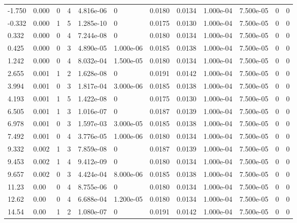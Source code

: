 \documentclass[preview]{standalone}
\begin{document}
{{\begin{tabular}{L{1.2cm}C{1.2cm} C{0.3cm}C{0.5cm} C{1.4cm}C{1.4cm} C{1.4cm}C{1.4cm} C{1.6cm}C{1.6cm} C{1.6cm}C{1.6cm}}
  -1.750  &  0.000  & 0     &  4 &  4.816e-06  & 0  &  0.0180&   0.0134& 1.000e-04 & 7.500e-05   &  0 & 0  \\ 
  -0.332  &  0.000  & 1     &  5 &  1.285e-10  & 0  &  0.0175&   0.0130& 1.000e-04 & 7.500e-05   &  0 & 0  \\ 
  0.332  &  0.000  & 0     &  4 &  7.244e-08  & 0  &  0.0180&   0.0134& 1.000e-04 & 7.500e-05   &  0 & 0  \\ 
  0.425  &  0.000  & 0     &  3 &  4.890e-05  & 1.000e-06  &  0.0185&   0.0138& 1.000e-04 & 7.500e-05   &  0 & 0  \\ 
  1.242  &  0.000  & 0     &  4 &  8.032e-04  & 1.500e-05  &  0.0180&   0.0134& 1.000e-04 & 7.500e-05   &  0 & 0  \\ 
  2.655  &  0.001  & 1     &  2 &  1.628e-08  & 0  &  0.0191&   0.0142& 1.000e-04 & 7.500e-05   &  0 & 0  \\ 
  3.994  &  0.001  & 0     &  3 &  1.817e-04  & 3.000e-06  &  0.0185&   0.0138& 1.000e-04 & 7.500e-05   &  0 & 0  \\ 
  4.193  &  0.001  & 1     &  5 &  1.422e-08  & 0  &  0.0175&   0.0130& 1.000e-04 & 7.500e-05   &  0 & 0  \\ 
  6.505  &  0.001  & 1     &  3 &  1.016e-07  & 0  &  0.0187&   0.0139& 1.000e-04 & 7.500e-05   &  0 & 0  \\ 
  6.978  &  0.001  & 0     &  3 &  1.597e-03  & 3.000e-05  &  0.0185&   0.0138& 1.000e-04 & 7.500e-05   &  0 & 0  \\ 
  7.492  &  0.001  & 0     &  4 &  3.776e-05  & 1.000e-06  &  0.0180&   0.0134& 1.000e-04 & 7.500e-05   &  0 & 0  \\ 
  9.332  &  0.002  & 1     &  3 &  7.859e-08  & 0  &  0.0187&   0.0139& 1.000e-04 & 7.500e-05   &  0 & 0  \\ 
  9.453  &  0.002  & 1     &  4 &  9.412e-09  & 0  &  0.0180&   0.0134& 1.000e-04 & 7.500e-05   &  0 & 0  \\ 
  9.657  &  0.002  & 0     &  3 &  4.424e-04  & 8.000e-06  &  0.0185&   0.0138& 1.000e-04 & 7.500e-05   &  0 & 0  \\ 
  11.23  &  0.00  & 0     &  4 &  8.755e-06  & 0  &  0.0180&   0.0134& 1.000e-04 & 7.500e-05   &  0 & 0  \\ 
  12.62  &  0.00  & 0     &  4 &  6.688e-04  & 1.200e-05  &  0.0180&   0.0134& 1.000e-04 & 7.500e-05   &  0 & 0  \\ 
  14.54  &  0.00  & 1     &  2 &  1.080e-07  & 0  &  0.0191&   0.0142& 1.000e-04 & 7.500e-05   &  0 & 0  \\ 

\end{tabular}}}
\end{document}
